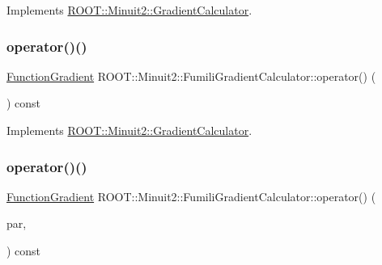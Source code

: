 Implements \mbox{\hyperlink{classROOT_1_1Minuit2_1_1GradientCalculator_a1bae913e96ffc9ece28664a5f6f79cb0}{R\+O\+O\+T\+::\+Minuit2\+::\+Gradient\+Calculator}}.

\mbox{\label{classROOT_1_1Minuit2_1_1FumiliGradientCalculator_a23fd61bceabbf88e66c5abe6b2815331}} 
\subsubsection{\texorpdfstring{operator()()}{operator()()}\hspace{0.1cm}{\footnotesize\ttfamily [3/6]}}
{\footnotesize\ttfamily \mbox{\hyperlink{classROOT_1_1Minuit2_1_1FunctionGradient}{Function\+Gradient}} R\+O\+O\+T\+::\+Minuit2\+::\+Fumili\+Gradient\+Calculator\+::operator() (\begin{DoxyParamCaption}\item[{const \mbox{\hyperlink{classROOT_1_1Minuit2_1_1MinimumParameters}{Minimum\+Parameters}} \&}]{ }\end{DoxyParamCaption}) const\hspace{0.3cm}{\ttfamily [virtual]}}



Implements \mbox{\hyperlink{classROOT_1_1Minuit2_1_1GradientCalculator_a1bae913e96ffc9ece28664a5f6f79cb0}{R\+O\+O\+T\+::\+Minuit2\+::\+Gradient\+Calculator}}.

\mbox{\label{classROOT_1_1Minuit2_1_1FumiliGradientCalculator_a652f65091b404ebda9a645d7ba92b3b6}} 
\subsubsection{\texorpdfstring{operator()()}{operator()()}\hspace{0.1cm}{\footnotesize\ttfamily [4/6]}}
{\footnotesize\ttfamily \mbox{\hyperlink{classROOT_1_1Minuit2_1_1FunctionGradient}{Function\+Gradient}} R\+O\+O\+T\+::\+Minuit2\+::\+Fumili\+Gradient\+Calculator\+::operator() (\begin{DoxyParamCaption}\item[{const \mbox{\hyperlink{classROOT_1_1Minuit2_1_1MinimumParameters}{Minimum\+Parameters}} \&}]{par,  }\item[{const \mbox{\hyperlink{classROOT_1_1Minuit2_1_1FunctionGradient}{Function\+Gradient}} \&}]{ }\end{DoxyParamCaption}) const\hspace{0.3cm}{\ttfamily [virtual]}}



